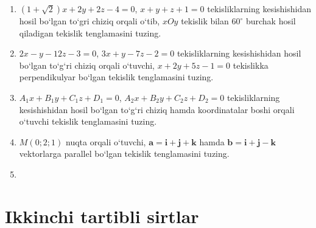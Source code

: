 \begin{enumerate}
	\item $(1+\sqrt{2})x+2y+2z-4=0$, $x+y+z+1=0$ tekisliklarning kesishishidan hosil bo`lgan to`gri chiziq orqali o`tib, $xOy$ tekislik bilan $60^\circ$ burchak hosil qiladigan tekislik tenglamasini tuzing.
	\item $2x-y-12z-3=0$, $3x+y-7z-2=0$ tekisliklarning kesishishidan hosil bo`lgan to`g`ri chiziq orqali o`tuvchi, $x+2y+5z-1=0$ tekislikka perpendikulyar bo`lgan tekislik tenglamasini tuzing.
	\item $A_1x+B_1y+C_1z+D_1=0$, $A_2x+B_2y+C_2z+D_2=0$ tekisliklarning kesishishidan hosil bo`lgan to`g`ri chiziq hamda koordinatalar boshi orqali o`tuvchi tekislik tenglamasini tuzing.
	\item $M(0;2;1)$ nuqta orqali o`tuvchi, $\textbf{a}=\textbf{i}+\textbf{j}+\textbf{k}$ hamda $\textbf{b}=\textbf{i}+\textbf{j}-\textbf{k}$ vektorlarga parallel bo`lgan tekislik tenglamasini tuzing.
	\item 

	
	
\end{enumerate}
\section{Ikkinchi tartibli sirtlar}
